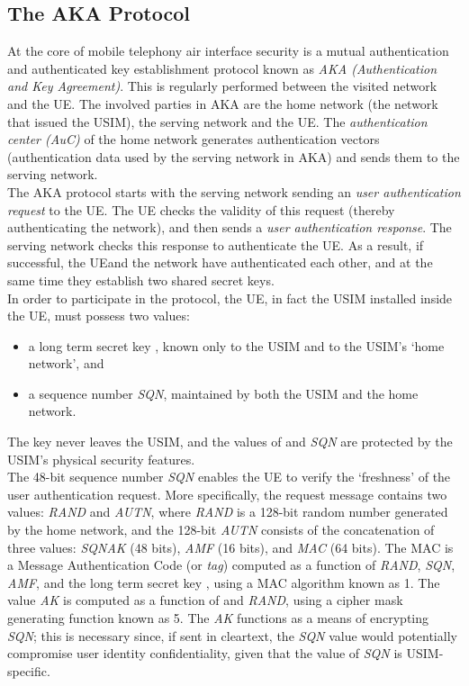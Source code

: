 \documentclass{acm_proc_article-sp}
\begin{document}
\subsection{The AKA Protocol}  \label{AKA}

At the core of mobile telephony air interface security is a mutual authentication and authenticated key establishment protocol known as \emph{AKA (Authentication and Key Agreement)}. This is regularly performed between the visited network and the UE\@. The involved parties in AKA are the home network (the network that issued the USIM), the serving network and the UE\@. The \emph{authentication center (AuC)} of the home network generates authentication vectors (authentication data used by the serving network in AKA) and sends them to the serving network. \\

The AKA protocol starts with the serving network sending an \emph{user
authentication request} to the UE\@. The UE checks the validity of
this request (thereby authenticating the network), and then sends a
\emph{user authentication response}. The serving network checks this
response to authenticate the UE\@.  As a result, if successful, the UE\@ and the network have authenticated each other, and at the same time they
establish two shared secret keys.\\

In order to participate in the protocol, the UE, in fact the USIM installed inside the UE, must possess two values:
\begin{itemize}
\item a long term secret key , known only to the USIM and to the USIM's `home network', and
\item a sequence number \emph{SQN}, maintained by both the
    USIM and the home network.
\end{itemize}

The key  never leaves the USIM, and the values of  and
\emph{SQN} are protected by the USIM's physical security
features.  \\

The 48-bit sequence number \emph{SQN} enables the UE
to verify the `freshness' of the user authentication request.
More specifically, the request message contains two values:
\emph{RAND} and \emph{AUTN}, where \emph{RAND} is a 128-bit
random number generated by the home network, and the 128-bit
\emph{AUTN} consists of the concatenation of three values:
\emph{SQN}\emph{AK} (48 bits), \emph{AMF} (16 bits),
and \emph{MAC} (64 bits). The MAC is a Message Authentication Code (or \emph{tag})
computed as a function of \emph{RAND}, \emph{SQN}, \emph{AMF},
and the long term secret key , using a MAC algorithm known
as 1. The value \emph{AK} is computed as a function of
 and \emph{RAND}, using a cipher mask generating function known as 5. 
The \emph{AK} functions as a means of
encrypting \emph{SQN}; this is necessary since, if sent in
cleartext, the \emph{SQN} value would potentially compromise
user identity confidentiality, given that the value of
\emph{SQN} is USIM-specific.\\
\end{document}
